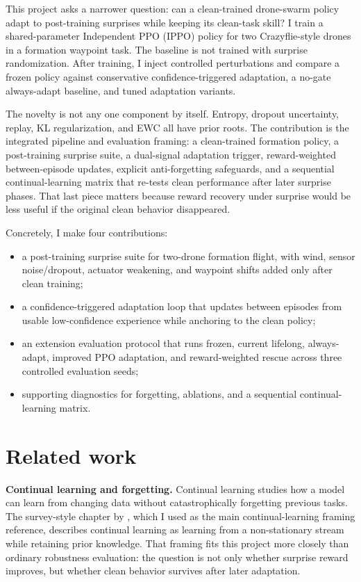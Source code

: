 \documentclass{article}
\begin{document}
This project asks a narrower question: can a clean-trained drone-swarm policy adapt to post-training surprises while keeping its clean-task skill? I train a shared-parameter Independent PPO (IPPO) policy for two Crazyflie-style drones in a formation waypoint task. The baseline is not trained with surprise randomization. After training, I inject controlled perturbations and compare a frozen policy against conservative confidence-triggered adaptation, a no-gate always-adapt baseline, and tuned adaptation variants.

The novelty is not any one component by itself. Entropy, dropout uncertainty, replay, KL regularization, and EWC all have prior roots. The contribution is the integrated pipeline and evaluation framing: a clean-trained formation policy, a post-training surprise suite, a dual-signal adaptation trigger, reward-weighted between-episode updates, explicit anti-forgetting safeguards, and a sequential continual-learning matrix that re-tests clean performance after later surprise phases. That last piece matters because reward recovery under surprise would be less useful if the original clean behavior disappeared.

Concretely, I make four contributions:
\begin{itemize}
  \item a post-training surprise suite for two-drone formation flight, with wind, sensor noise/dropout, actuator weakening, and waypoint shifts added only after clean training;
  \item a confidence-triggered adaptation loop that updates between episodes from usable low-confidence experience while anchoring to the clean policy;
  \item an extension evaluation protocol that runs frozen, current lifelong, always-adapt, improved PPO adaptation, and reward-weighted rescue across three controlled evaluation seeds;
  \item supporting diagnostics for forgetting, ablations, and a sequential continual-learning matrix.
\end{itemize}

\section{Related work}

\textbf{Continual learning and forgetting.} Continual learning studies how a model can learn from changing data without catastrophically forgetting previous tasks. The survey-style chapter by \citet{van2024continual}, which I used as the main continual-learning framing reference, describes continual learning as learning from a non-stationary stream while retaining prior knowledge. That framing fits this project more closely than ordinary robustness evaluation: the question is not only whether surprise reward improves, but whether clean behavior survives after later adaptation.
\end{document}
